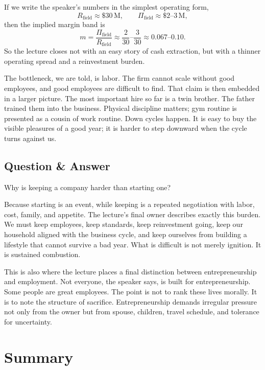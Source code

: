 If we write the speaker's numbers in the simplest operating form,
\[
R_{\mathrm{field}} \approx \$30\,\mathrm{M},
\qquad
\Pi_{\mathrm{field}} \approx \$2\text{--}3\,\mathrm{M},
\]
then the implied margin band is
\begin{equation}
m = \frac{\Pi_{\mathrm{field}}}{R_{\mathrm{field}}}
\approx \frac{2}{30}\text{--}\frac{3}{30}
\approx 0.067\text{--}0.10.
\end{equation}
So the lecture closes not with an easy story of cash extraction, but with a thinner operating spread and a reinvestment burden.

The bottleneck, we are told, is labor. The firm cannot scale without good employees, and good employees are difficult to find. That claim is then embedded in a larger picture. The most important hire so far is a twin brother. The father trained them into the business. Physical discipline matters; gym routine is presented as a cousin of work routine. Down cycles happen. It is easy to buy the visible pleasures of a good year; it is harder to step downward when the cycle turns against us.

\subsection{Question \& Answer}

Why is keeping a company harder than starting one?

Because starting is an event, while keeping is a repeated negotiation with labor, cost, family, and appetite. The lecture's final owner describes exactly this burden. We must keep employees, keep standards, keep reinvestment going, keep our household aligned with the business cycle, and keep ourselves from building a lifestyle that cannot survive a bad year. What is difficult is not merely ignition. It is sustained combustion.

This is also where the lecture places a final distinction between entrepreneurship and employment. Not everyone, the speaker says, is built for entrepreneurship. Some people are great employees. The point is not to rank these lives morally. It is to note the structure of sacrifice. Entrepreneurship demands irregular pressure not only from the owner but from spouse, children, travel schedule, and tolerance for uncertainty.

\section{Summary}

